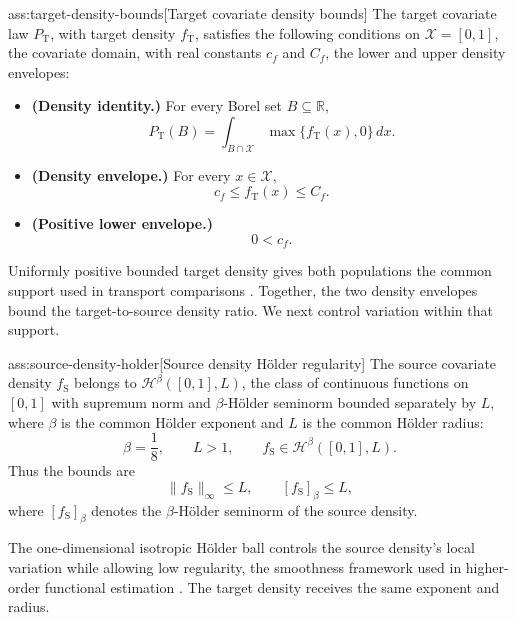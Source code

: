 \begin{assumptionv}{ass:target-density-bounds}[Target covariate density bounds]
The target covariate law \(P_{\mathrm T}\), with target density \(f_{\mathrm T}\), satisfies the following conditions on \(\mathcal X=[0,1]\), the covariate domain, with real constants \(c_f\) and \(C_f\), the lower and upper density envelopes:
\begin{itemize}
\item \textbf{(Density identity.)} For every Borel set \(B\subseteq\mathbb R\),
\[
P_{\mathrm T}(B)=\int_{B\cap\mathcal X}\max\{f_{\mathrm T}(x),0\}\,dx.
\]
\item \textbf{(Density envelope.)} For every \(x\in\mathcal X\),
\[
c_f\le f_{\mathrm T}(x)\le C_f.
\]
\item \textbf{(Positive lower envelope.)}
\[
0<c_f.
\]
\end{itemize}
\end{assumptionv}

Uniformly positive bounded target density gives both populations the common support used in transport comparisons \citep{ZengKennedyBodnarNaimi2025Efficient}. Together, the two density envelopes bound the target-to-source density ratio. We next control variation within that support.

\begin{assumptionv}{ass:source-density-holder}[Source density Hölder regularity]
The source covariate density \(f_{\mathrm S}\) belongs to \(\mathcal H^{\beta}([0,1],L)\), the class of continuous functions on \([0,1]\) with supremum norm and \(\beta\)-Hölder seminorm bounded separately by \(L\), where \(\beta\) is the common Hölder exponent and \(L\) is the common Hölder radius:
\[
\beta=\frac18,\qquad L>1,\qquad
f_{\mathrm S}\in\mathcal H^{\beta}([0,1],L).
\]
Thus the bounds are
\[
\lVert f_{\mathrm S}\rVert_{\infty}\le L,
\qquad
[f_{\mathrm S}]_{\beta}\le L,
\]
where \([f_{\mathrm S}]_{\beta}\) denotes the \(\beta\)-Hölder seminorm of the source density.
\end{assumptionv}

The one-dimensional isotropic Hölder ball controls the source density's local variation while allowing low regularity, the smoothness framework used in higher-order functional estimation \citep{RobinsLiMukherjeeTchetgenVanDerVaart2017HigherOrder}. The target density receives the same exponent and radius.

